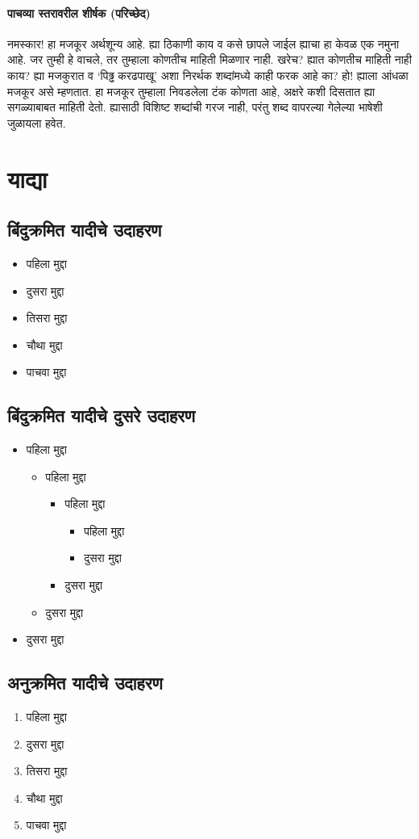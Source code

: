 \paragraph{पाचव्या स्तरावरील शीर्षक (परिच्छेद)}
नमस्कार! हा मजकूर अर्थशून्य आहे. ह्या ठिकाणी काय व कसे छापले जाईल ह्याचा हा केवळ एक नमुना आहे. जर तुम्ही हे वाचले, तर तुम्हाला कोणतीच माहिती मिळणार नाही. खरेच? ह्यात कोणतीच माहिती नाही काय? ह्या मजकुरात व `पिढ्ढ करढपाखू' अशा निरर्थक शब्दांमध्ये काही फरक आहे का? हो! ह्याला आंधळा मजकूर असे म्हणतात. हा मजकूर तुम्हाला निवडलेला टंक कोणता आहे, अक्षरे कशी दिसतात ह्या सगळ्याबाबत माहिती देतो. ह्यासाठी विशिष्ट शब्दांची गरज नाही, परंतु शब्द वापरल्या गेलेल्या भाषेशी जुळायला हवेत.
\section{याद्या}
\subsection{बिंदुक्रमित यादीचे उदाहरण}
\begin{itemize}
\item पहिला मुद्दा
\item दुसरा मुद्दा
\item तिसरा मुद्दा
\item चौथा मुद्दा
\item पाचवा मुद्दा
\end{itemize}
\subsection*{बिंदुक्रमित यादीचे दुसरे उदाहरण}
\begin{itemize}
\item पहिला मुद्दा
\begin{itemize}
\item पहिला मुद्दा
\begin{itemize}
\item पहिला मुद्दा
\begin{itemize}
\item पहिला मुद्दा
\item दुसरा मुद्दा
\end{itemize}
\item दुसरा मुद्दा
\end{itemize}
\item दुसरा मुद्दा
\end{itemize}
\item दुसरा मुद्दा
\end{itemize}
\subsection{अनुक्रमित यादीचे उदाहरण}
\begin{enumerate}
\item पहिला मुद्दा
\item दुसरा मुद्दा
\item तिसरा मुद्दा
\item चौथा मुद्दा
\item पाचवा मुद्दा
\end{enumerate}
